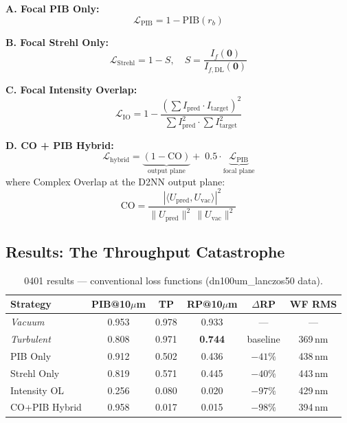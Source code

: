 \documentclass[11pt,a4paper]{article}
\begin{document}
\noindent\textbf{A. Focal PIB Only:}
\begin{equation}
\mathcal{L}_{\mathrm{PIB}} = 1 - \mathrm{PIB}(r_b)
\end{equation}

\noindent\textbf{B. Focal Strehl Only:}
\begin{equation}
\mathcal{L}_{\mathrm{Strehl}} = 1 - S, \quad S = \frac{I_f(\mathbf{0})}{I_{f,\mathrm{DL}}(\mathbf{0})}
\end{equation}

\noindent\textbf{C. Focal Intensity Overlap:}
\begin{equation}
\mathcal{L}_{\mathrm{IO}} = 1 - \frac{\left(\sum I_{\mathrm{pred}} \cdot I_{\mathrm{target}}\right)^2}{\sum I_{\mathrm{pred}}^2 \cdot \sum I_{\mathrm{target}}^2}
\end{equation}

\noindent\textbf{D. CO + PIB Hybrid:}
\begin{equation}
\mathcal{L}_{\mathrm{hybrid}} = \underbrace{(1 - \mathrm{CO})}_{\text{output plane}} + \; 0.5 \cdot \underbrace{\mathcal{L}_{\mathrm{PIB}}}_{\text{focal plane}}
\end{equation}
where Complex Overlap at the D2NN output plane:
\begin{equation}
\mathrm{CO} = \frac{|\langle U_{\mathrm{pred}}, U_{\mathrm{vac}} \rangle|^2}{\|U_{\mathrm{pred}}\|^2 \, \|U_{\mathrm{vac}}\|^2}
\end{equation}

\subsection{Results: The Throughput Catastrophe}

\begin{table}[H]
\centering
\caption{0401 results --- conventional loss functions (dn100um\_lanczos50 data).}
\begin{tabular}{l c c c c c}
\toprule
Strategy & PIB@10$\mu$m & TP & RP@10$\mu$m & $\Delta$RP & WF RMS \\
\midrule
\textit{Vacuum} & 0.953 & 0.978 & 0.933 & --- & --- \\
\textit{Turbulent} & 0.808 & 0.971 & \textbf{0.744} & baseline & 369\,nm \\
\midrule
PIB Only & 0.912 & 0.502 & 0.436 & \textcolor{negative}{$-41\%$} & 438\,nm \\
Strehl Only & 0.819 & 0.571 & 0.445 & \textcolor{negative}{$-40\%$} & 443\,nm \\
Intensity OL & 0.256 & 0.080 & 0.020 & \textcolor{negative}{$-97\%$} & 429\,nm \\
CO+PIB Hybrid & 0.958 & 0.017 & 0.015 & \textcolor{negative}{$-98\%$} & 394\,nm \\
\bottomrule
\end{tabular}
\end{table}
\end{document}
